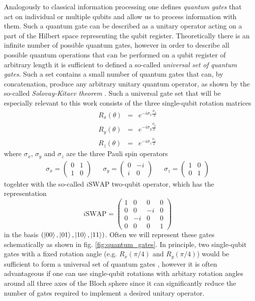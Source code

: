 Analogously to classical information processing one defines {\it quantum gates} that act on individual or multiple qubits and allow us to process information with them. Such a quantum gate can be described as a unitary operator acting on a part of the Hilbert space representing the qubit register. Theoretically there is an infinite number of possible quantum gates, however in order to describe all possible quantum operations that can be performed on a qubit register of arbitrary length it is sufficient to defined a so-called {\it universal set of quantum gates}. Such a set contains a small number of quantum gates that can, by concatenation, produce any arbitrary unitary quantum operator, as shown by the so-called {\it Solovay-Kitaev theorem} \citep{nielsen_quantum_2000,dawson_solovay-kitaev_2005}. Such a universal gate set that will be especially relevant to this work consists of the three single-qubit rotation matrices
%
\begin{eqnarray}
   R_x(\theta)  & = & e^{-i\sigma_x\frac{\phi_x}{2}} \\ 
   R_y(\theta)  & = & e^{-i\sigma_y\frac{\phi_y}{2}} \\ 
   R_z(\theta)  & = & e^{-i\sigma_z\frac{\phi_z}{2}} 
\label{eq:universal_single_qubit_gates}
\end{eqnarray}
%
where $\sigma_x$, $\sigma_y$ and $\sigma_z$ are the three Pauli spin operators
%
\begin{align}
  \sigma_x  =  \left( \begin{array}{cc} 0 & 1 \\ 1 & 0 \end{array} \right) 
  & & \sigma_y  =  \left( \begin{array}{cc} 0 & -i \\ i  &  0\end{array} \right) 
  & & \sigma_z  =  \left( \begin{array}{cc} 1 & 0 \\ 0 & 1 \end{array} \right) 
\label{eq:pauli_operators}
\end{align}
%
togehter with the so-called $i\mathrm{SWAP}$ two-qubit operator, which has the representation
%
\begin{equation}
i\mathrm{SWAP} = \left( \begin{array}{cccc} 1 & 0 & 0 & 0 \\ 0 & 0 & -i & 0 \\ 0 & -i & 0 & 0 \\ 0 & 0 & 0 & 1  \end{array}  \right)
\end{equation}
%
in the basis $(\left| 00 \right>,\left| 01 \right>,\left| 10 \right>,\left| 11 \right>)$. Often we will represent these gates schematically as shown in fig. \ref{fig:quantum_gates}. In principle, two single-qubit gates with a fixed rotation angle (e.g. $R_x(\pi/4)$ and $R_y(\pi/4)$) would be sufficient to form a universal set of quantum gates \citep{dawson_solovay-kitaev_2005}, however it is often advantageous if one can use single-qubit rotations with arbitary rotation angles around all three axes of the Bloch sphere since it can significantly reduce the number of gates required to implement a desired unitary operator.

